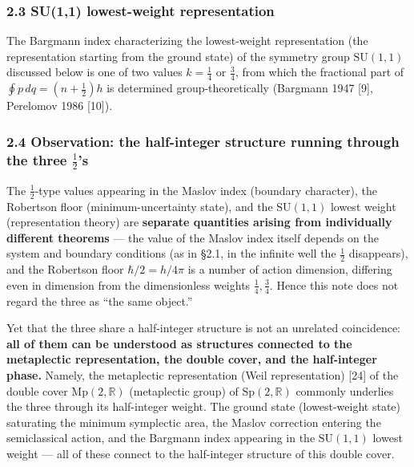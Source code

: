 \documentclass[
]{article}
\begin{document}
\subsubsection{2.3 SU(1,1) lowest-weight
representation}\label{su11-lowest-weight-representation}

The Bargmann index characterizing the lowest-weight representation (the
representation starting from the ground state) of the symmetry group
\(\mathrm{SU}(1,1)\) discussed below is one of two values \(k=\tfrac14\)
or \(\tfrac34\), from which the fractional part of
\(\oint p\,dq=(n+\tfrac12)h\) is determined group-theoretically
(Bargmann 1947 {[}9{]}, Perelomov 1986 {[}10{]}).

\subsubsection{\texorpdfstring{2.4 Observation: the half-integer
structure running through the three
\(\tfrac12\)'s}{2.4 Observation: the half-integer structure running through the three \textbackslash tfrac12's}}\label{observation-the-half-integer-structure-running-through-the-three-tfrac12s}

The \(\tfrac12\)-type values appearing in the Maslov index (boundary
character), the Robertson floor (minimum-uncertainty state), and the
\(\mathrm{SU}(1,1)\) lowest weight (representation theory) are
\textbf{separate quantities arising from individually different
theorems} --- the value of the Maslov index itself depends on the system
and boundary conditions (as in §2.1, in the infinite well the
\(\tfrac12\) disappears), and the Robertson floor \(\hbar/2=h/4\pi\) is
a number of action dimension, differing even in dimension from the
dimensionless weights \(\tfrac14,\tfrac34\). Hence this note does not
regard the three as ``the same object.''

Yet that the three share a half-integer structure is not an unrelated
coincidence: \textbf{all of them can be understood as structures
connected to the metaplectic representation, the double cover, and the
half-integer phase.} Namely, the metaplectic representation (Weil
representation) {[}24{]} of the double cover
\(\mathrm{Mp}(2,\mathbb{R})\) (metaplectic group) of
\(\mathrm{Sp}(2,\mathbb{R})\) commonly underlies the three through its
half-integer weight. The ground state (lowest-weight state) saturating
the minimum symplectic area, the Maslov correction entering the
semiclassical action, and the Bargmann index appearing in the
\(\mathrm{SU}(1,1)\) lowest weight --- all of these connect to the
half-integer structure of this double cover.
\end{document}
